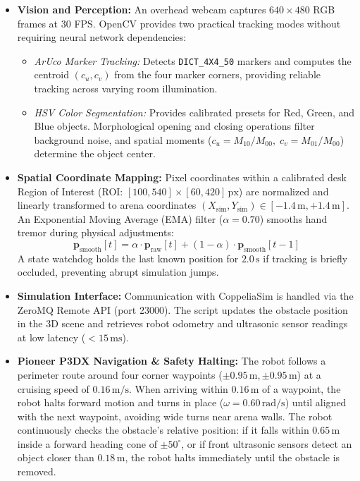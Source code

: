 \documentclass[10pt,a4paper]{article}
\begin{document}
\begin{itemize}
    \item \textbf{Vision and Perception:} An overhead webcam captures $640\times480$ RGB frames at 30 FPS. OpenCV provides two practical tracking modes without requiring neural network dependencies:
    \begin{itemize}
        \item \textit{ArUco Marker Tracking:} Detects \texttt{DICT\_4X4\_50} markers and computes the centroid $(c_u, c_v)$ from the four marker corners, providing reliable tracking across varying room illumination.
        \item \textit{HSV Color Segmentation:} Provides calibrated presets for Red, Green, and Blue objects. Morphological opening and closing operations filter background noise, and spatial moments ($c_u = M_{10}/M_{00},\; c_v = M_{01}/M_{00}$) determine the object center.
    \end{itemize}

    \item \textbf{Spatial Coordinate Mapping:} Pixel coordinates within a calibrated desk Region of Interest (ROI: $[100, 540]\times[60, 420]\,\mathrm{px}$) are normalized and linearly transformed to arena coordinates $(X_{\text{sim}}, Y_{\text{sim}}) \in [-1.4\,\mathrm{m}, +1.4\,\mathrm{m}]$. An Exponential Moving Average (EMA) filter ($\alpha = 0.70$) smooths hand tremor during physical adjustments:
    \begin{equation}
        \mathbf{p}_{\text{smooth}}[t] = \alpha \cdot \mathbf{p}_{\text{raw}}[t] + (1 - \alpha) \cdot \mathbf{p}_{\text{smooth}}[t-1]
    \end{equation}
    A state watchdog holds the last known position for $2.0\,\mathrm{s}$ if tracking is briefly occluded, preventing abrupt simulation jumps.

    \item \textbf{Simulation Interface:} Communication with CoppeliaSim is handled via the ZeroMQ Remote API (port 23000). The script updates the obstacle position in the 3D scene and retrieves robot odometry and ultrasonic sensor readings at low latency ($<15\,\mathrm{ms}$).

    \item \textbf{Pioneer P3DX Navigation \& Safety Halting:} The robot follows a perimeter route around four corner waypoints ($\pm 0.95\,\mathrm{m}, \pm 0.95\,\mathrm{m}$) at a cruising speed of $0.16\,\mathrm{m/s}$. When arriving within $0.16\,\mathrm{m}$ of a waypoint, the robot halts forward motion and turns in place ($\omega = 0.60\,\mathrm{rad/s}$) until aligned with the next waypoint, avoiding wide turns near arena walls. The robot continuously checks the obstacle's relative position: if it falls within $0.65\,\mathrm{m}$ inside a forward heading cone of $\pm 50^\circ$, or if front ultrasonic sensors detect an object closer than $0.18\,\mathrm{m}$, the robot halts immediately until the obstacle is removed.
\end{itemize}
\end{document}
